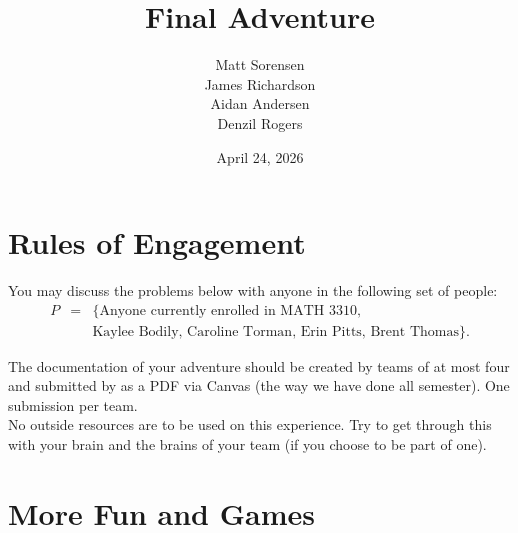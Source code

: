 \documentclass[answers]{exam}
\title{Final Adventure}
\author{
Matt Sorensen\\
James Richardson \\
Aidan Andersen \\
Denzil Rogers\\
}
\date{April 24, 2026}
\begin{document}
\maketitle



	\section*{Rules of Engagement}
	
You may discuss the problems below with anyone in the following set of people: 
\begin{eqnarray*}P &=& \{\mbox{Anyone currently enrolled in MATH 3310}, \\ 
	&& \mbox{Kaylee Bodily, Caroline Torman, Erin Pitts, Brent Thomas}\}.\end{eqnarray*}


	\noindent The documentation of your adventure should be created by teams of at most four and submitted by  as a PDF via Canvas (the way we have done all semester). One submission per team.\\
	
	\noindent No outside resources are to be used on this experience.  
	Try to get through this with your brain and the brains of your team (if you choose to be part of one). \\
	
	
	\section{More Fun and Games}  
	
\end{document}
